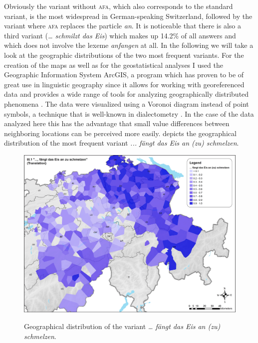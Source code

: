 \documentclass[output=paper]{LSP/langsci}
\begin{document}
Obviously the variant without \textsc{afa}, which also corresponds to the standard variant, is the most widespread in German-speaking Switzerland, followed by the variant where \textsc{afa }replaces the particle \emph{an}. It is noticeable that there is also a third variant (\emph{… schmilzt das Eis}) which makes up 14.2\% of all answers and which does not involve the lexeme \emph{anfangen} at all. In the following we will take a look at the geographic distributions of the two most frequent variants. For the creation of the maps as well as for the geostatistical analyses I used the Geographic Information System ArcGIS, a program which has proven to be of great use in linguistic geography since it allows for working with georeferenced data and provides a wide range of tools for analyzing geographically distributed phenomena \citep{montgomery_geographic_2013,stoeckle_subjektive_2014}. The data were visualized using a Voronoi diagram instead of point symbols, a technique that is well-known in dialectometry \citep{goebl_dialectometry_2010,nerbonne_mapping_2010}. In the case of the data analyzed here this has the advantage that small value differences between neighboring locations can be perceived more easily.  depicts the geographical distribution of the most frequent variant \emph{... fängt das Eis an (zu) schmelzen}.

\begin{figure}
\includegraphics[width=\textwidth]{illustrations/stoeck_fig1}
\label{fig:1}
\caption{Geographical distribution of the variant \emph{… fängt das Eis an (zu) schmelzen}.}
\end{figure}
\end{document}
